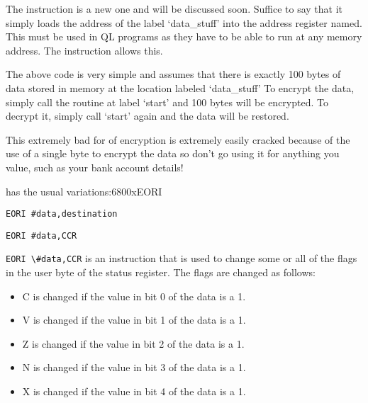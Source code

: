 The  instruction is a new one and will be discussed soon. Suffice
    to say that it simply loads the address of the label `data\_stuff' into the
    address register named. This must be used in QL programs as they have to
    be able to run at any memory address. The  instruction allows
    this.

The above code is very simple and assumes that there is exactly 100
    bytes of data stored in memory at the location labeled `data\_stuff' To
    encrypt the data, simply call the routine at label `start' and 100 bytes
    will be encrypted. To decrypt it, simply call `start' again and the data
    will be restored. 

\begin{warning}This extremely bad for of encryption is extremely easily cracked because of the use of a single
    byte to encrypt the data so don't go using it for anything you value, such as your bank account details!
\end{warning}

 has the usual variations:\mc6800x{EORI}

\begin{lstlisting}[firstnumber=1,]
          EORI #data,destination
\end{lstlisting}


\begin{lstlisting}[firstnumber=1,]
          EORI #data,CCR
\end{lstlisting}

\lstinline{EORI \#data,CCR} is an instruction that is used to change some or all
    of the flags in the user byte of the status register. The flags are
    changed as follows:
\begin{itemize}[itemsep=0pt]

\item{}C is changed if the value in bit 0 of the data is a 1.


\item{}V is changed if the value in bit 1 of the data is a 1.


\item{}Z is changed if the value in bit 2 of the data is a 1.


\item{}N is changed if the value in bit 3 of the data is a 1.


\item{}X is changed if the value in bit 4 of the data is a 1.

\end{itemize}

